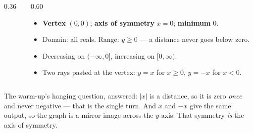 \documentclass[aspectratio=169, 11pt]{beamer}
\newcommand{\lgrid}[4]{%
  \draw[step=1, linegray!40, very thin] (#1,#3) grid (#2,#4);
  \draw[->, thick, charcoal] (#1,0)--(#2,0) node[below right, font=\tiny]{$x$};
  \draw[->, thick, charcoal] (0,#3)--(0,#4) node[left, font=\tiny]{$y$};}
\begin{document}
\begin{frame}[t, plain]
  \begin{columns}[T]
    \begin{column}{0.36\textwidth}
      \centering
    \end{column}
    \begin{column}{0.60\textwidth}
      \begin{itemize}\setlength{\itemsep}{4pt}
        \item \textbf{Vertex} $(0,0)$; \textbf{axis of symmetry} $x=0$; \textbf{minimum} $0$.
        \item Domain: all reals. Range: $y\ge0$ --- a distance never goes below zero.
        \item Decreasing on $(-\infty,0]$, increasing on $[0,\infty)$.
        \item Two rays pasted at the vertex: $y=x$ for $x\ge0$, $y=-x$ for $x<0$.
      \end{itemize}
    \end{column}
  \end{columns}
  \vspace{4pt}
  The warm-up's hanging question, answered: $|x|$ is a distance, so it is zero \emph{once} and
  never negative --- that is the single turn. And $x$ and $-x$ give the same output, so the graph
  is a mirror image across the $y$-axis. That symmetry \emph{is} the axis of symmetry.
\end{frame}
\end{document}
